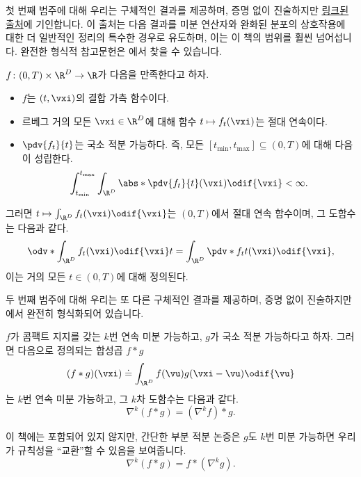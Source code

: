 \documentclass[../../book-main_ko.tex]{subfiles}
\begin{document}
첫 번째 범주에 대해 우리는 구체적인 결과를 제공하며, 증명 없이 진술하지만 \href{https://planetmath.org/differentiationundertheintegralsign}{링크된 출처}에 기인합니다. 이 출처는 다음 결과를 미분 연산자와 완화된 분포의 상호작용에 대한 더 일반적인 정리의 특수한 경우로 유도하며, 이는 이 책의 범위를 훨씬 넘어섭니다. 완전한 형식적 참고문헌은 \cite{jones1982theory}에서 찾을 수 있습니다.
\begin{proposition}\label{prop:dutis}
    \(f \colon (0, T) \times \R^{D} \to \R\)가 다음을 만족한다고 하자.
    \begin{itemize}
        \item \(f\)는 \((t, \vxi)\)의 결합 가측 함수이다.
        \item 르베그 거의 모든 \(\vxi \in \R^{D}\)에 대해 함수 \(t \mapsto f_{t}(\vxi)\)는 절대 연속이다.
        \item \(\pdv{f_{t}}{t}\)는 국소 적분 가능하다. 즉, 모든 \([t_{\min}, t_{\max}] \subseteq (0, T)\)에 대해 다음이 성립한다.
        \begin{equation}
            \int_{t_{\min}}^{t_{\max}}\int_{\R^{D}}\abs*{\pdv{f_{t}}{t}(\vxi)}\odif{\vxi} < \infty.
        \end{equation}
    \end{itemize}
    그러면 \(t \mapsto \int_{\R^{D}}f_{t}(\vxi)\odif{\vxi}\)는 \((0, T)\)에서 절대 연속 함수이며, 그 도함수는 다음과 같다.
    \begin{equation}
        \odv*{\int_{\R^{D}}f_{t}(\vxi)\odif{\vxi}}{t} = \int_{\R^{D}}\pdv*{f_{t}}{t}(\vxi)\odif{\vxi},
    \end{equation}
    이는 거의 모든 \(t \in (0, T)\)에 대해 정의된다.
\end{proposition}

두 번째 범주에 대해 우리는 또 다른 구체적인 결과를 제공하며, 증명 없이 진술하지만 \cite{brezis2011functional}에서 완전히 형식화되어 있습니다.
\begin{proposition}\label{prop:diff_convolution}
    \(f\)가 콤팩트 지지를 갖는 \(k\)번 연속 미분 가능하고, \(g\)가 국소 적분 가능하다고 하자. 그러면 다음으로 정의되는 합성곱 \(f * g\)
    \begin{equation}
        (f * g)(\vxi) \doteq \int_{\R^{D}}f(\vu)g(\vxi - \vu)\odif{\vu}
    \end{equation}
    는 \(k\)번 연속 미분 가능하고, 그 \(k\)차 도함수는 다음과 같다.
    \begin{equation}
        \nabla^{k}(f * g) =(\nabla^{k}f) * g.
    \end{equation}
\end{proposition}
이 책에는 포함되어 있지 않지만, 간단한 부분 적분 논증은 \(g\)도 \(k\)번 미분 가능하면 우리가 규칙성을 ``교환''할 수 있음을 보여줍니다.
\begin{equation}
    \nabla^{k}(f * g) = f * (\nabla^{k} g).
\end{equation}
\end{document}
